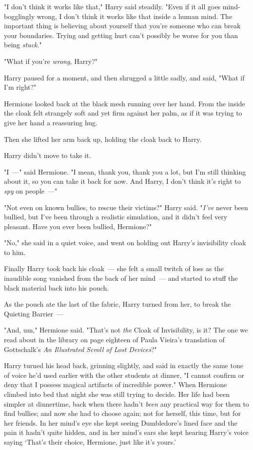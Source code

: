 "I don't think it works like that," Harry said steadily. "Even if it all goes
mind-bogglingly wrong, I don't think it works like that inside a human mind.
The important thing is believing about yourself that you're someone who can
break your boundaries. Trying and getting hurt can't possibly be worse for you
than being{\el} \emph{stuck}."

"What if you're \emph{wrong,} Harry?"

Harry paused for a moment, and then shrugged a little sadly, and said, "What if
I'm right?"

Hermione looked back at the black mesh running over her hand. From the inside
the cloak felt strangely soft and yet firm against her palm, as if it was
trying to give her hand a reassuring hug.

Then she lifted her arm back up, holding the cloak back to Harry.

Harry didn't move to take it.

"I~---" said Hermione. "I mean, thank you, thank you a lot, but I'm still
thinking about it, so you can take it back for now. And{\el} Harry, I don't
think it's right to \emph{spy} on people~---"

"Not even on known bullies, to rescue their victims?" Harry said. "\emph{I've}
never been bullied, but I've been through a realistic simulation, and it didn't
feel very pleasant. Have you ever been bullied, Hermione?"

"No," she said in a quiet voice, and went on holding out Harry's invisibility
cloak to him.

Finally Harry took back his cloak~--- she felt a small twitch of loss as the
inaudible song vanished from the back of her mind~--- and started to stuff the
black material back into his pouch.

As the pouch ate the last of the fabric, Harry turned from her, to break the
Quieting Barrier~---

"And, um," Hermione said. "That's not \emph{the} Cloak of Invisibility, is it?
The one we read about in the library on page eighteen of Paula Vieira's
translation of Gottschalk's \emph{An Illustrated Scroll of Lost Devices}?"

Harry turned his head back, grinning slightly, and said in exactly the same
tone of voice he'd used earlier with the other students at dinner, "I cannot
confirm or deny that I possess magical artifacts of incredible power."
\sbreak
When Hermione climbed into bed that night she was still trying to decide. Her
life had been simpler at dinnertime, back when there hadn't \emph{been} any
practical way for them to find bullies; and now she had to choose again; not
for herself, this time, but for her friends. In her mind's eye she kept seeing
Dumbledore's lined face and the pain it hadn't quite hidden, and in her mind's
ears she kept hearing Harry's voice saying `That's their choice, Hermione, just
like it's yours.'

